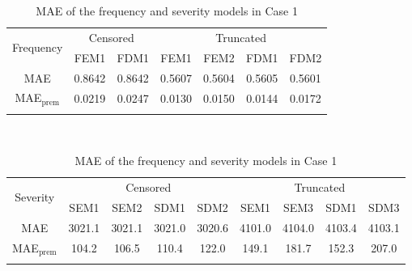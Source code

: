 \begin{table}[!h]
\renewcommand{\tabcolsep}{0.8mm}
\renewcommand{\arraystretch}{1}
\footnotesize
\centering
{\color{blue}
\begin{tabular}[h]{ccccccc}
\toprule
\multirow{2}{*}{Frequency} & \multicolumn{2}{c}{Censored} & \multicolumn{4}{c}{Truncated}\\
\cmidrule(l{3pt}r{3pt}){2-3} \cmidrule(l{3pt}r{3pt}){4-7}
 & FEM1 & FDM1 & FEM1 & FEM2 & FDM1 & FDM2\\
\midrule
MAE & 0.8642 & 0.8642 & 0.5607 & 0.5604 & 0.5605 & 0.5601 \\
MAE$_{\text{prem}}$ & 0.0219 & 0.0247 & 0.0130 & 0.0150 & 0.0144 & 0.0172 \\
\hhline{=======}
\end{tabular}
\\
\vspace{0.3cm}
\begin{tabular}[h]{ccccccccc}
\toprule
\multirow{2}{*}{Severity} & \multicolumn{4}{c}{Censored} & \multicolumn{4}{c}{Truncated}\\
\cmidrule(l{3pt}r{3pt}){2-5} \cmidrule(l{3pt}r{3pt}){6-9}
 & SEM1 & SEM2 & SDM1 & SDM2 & SEM1 & SEM3 & SDM1 & SDM3\\
\midrule
MAE & 3021.1 & 3021.1 & 3021.0 & 3020.6 & 4101.0 & 4104.0 & 4103.4 & 4103.1 \\
MAE$_{\text{prem}}$ & 104.2 & 106.5 & 110.4 & 122.0 & 149.1 & 181.7 & 152.3 & 207.0 \\
\hhline{=========}
\end{tabular}
}
\caption{MAE of the frequency and severity models in Case 1}\label{tab:maecase1}
\end{table}
